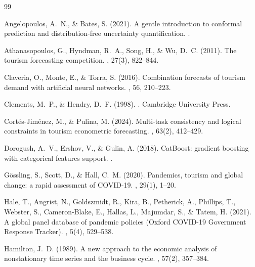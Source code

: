 \documentclass[12pt,a4paper,oneside]{report}
\begin{document}
\begin{thebibliography}{99}

Angelopoulos, A.~N., \& Bates, S. (2021).
\newblock A gentle introduction to conformal prediction and distribution-free uncertainty quantification.
.

Athanasopoulos, G., Hyndman, R.~A., Song, H., \& Wu, D.~C. (2011).
\newblock The tourism forecasting competition.
, 27(3), 822--844.

Claveria, O., Monte, E., \& Torra, S. (2016).
\newblock Combination forecasts of tourism demand with artificial neural networks.
, 56, 210--223.

Clements, M.~P., \& Hendry, D.~F. (1998).
.
\newblock Cambridge University Press.

Cort{\'e}s-Jim{\'e}nez, M., \& Pulina, M. (2024).
\newblock Multi-task consistency and logical constraints in tourism econometric forecasting.
, 63(2), 412--429.

Dorogush, A.~V., Ershov, V., \& Gulin, A. (2018).
\newblock CatBoost: gradient boosting with categorical features support.
.

G{\"o}ssling, S., Scott, D., \& Hall, C.~M. (2020).
\newblock Pandemics, tourism and global change: a rapid assessment of COVID-19.
, 29(1), 1--20.

Hale, T., Angrist, N., Goldszmidt, R., Kira, B., Petherick, A., Phillips, T., Webster, S., Cameron-Blake, E., Hallas, L., Majumdar, S., \& Tatem, H. (2021).
\newblock A global panel database of pandemic policies (Oxford COVID-19 Government Response Tracker).
, 5(4), 529--538.

Hamilton, J.~D. (1989).
\newblock A new approach to the economic analysis of nonstationary time series and the business cycle.
, 57(2), 357--384.


\end{thebibliography}
\end{document}
